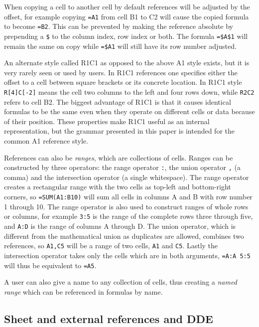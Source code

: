 \documentclass[conference]{IEEEtran}
\begin{document}
When copying a cell to another cell by default references will be adjusted by the offset, for example copying \texttt{=A1} from cell B1 to C2 will cause the copied formula to become \texttt{=B2}.
This can be prevented by making the reference absolute by prepending a \texttt{\$} to the column index, row index or both.
The formula \texttt{=\$A\$1} will remain the same on copy while \texttt{=\$A1} will still have its row number adjusted.

An alternate style called R1C1 as opposed to the above A1 style exists, but it is very rarely seen or used by users.
In R1C1 references one specifies either the offset to a cell between square brackets or its concrete location.
In R1C1 style \texttt{R[4]C[-2]} means the cell two columns to the left and four rows down, while \texttt{R2C2} refers to cell B2.
The biggest advantage of R1C1 is that it causes identical formulas to be the same even when they operate on different cells or data because of their position.
These properties make R1C1 useful as an internal representation, but the grammar presented in this paper is intended for the common A1 reference style.

References can also be \emph{ranges}, which are collections of cells.
Ranges can be constructed by three operators: the range operator \texttt{:}, the union operator \texttt{,} (a comma) and the intersection operator \texttt{} (a single whitespace).
The range operator creates a rectangular range with the two cells as top-left and bottom-right corners, so \texttt{=SUM(A1:B10)} will sum all cells in columns A and B with row number 1 through 10.
The range operator is also used to construct ranges of whole rows or columns, for example \texttt{3:5} is the range of the complete rows three through five, and \texttt{A:D} is the range of columns A through D.
The union operator, which is different from the mathematical union as duplicates are allowed, combines two references, so \texttt{A1,C5} will be a range of two cells, \texttt{A1} and \texttt{C5}.
Lastly the intersection operator takes only the cells which are in both arguments, \texttt{=A:A 5:5} will thus be equivalent to \texttt{=A5}.

A user can also give a name to any collection of cells, thus creating a \emph{named range} which can be referenced in formulas by name.

\subsection{Sheet and external references and DDE}
\label{subsection:ExternalRefsDDE}
\end{document}
